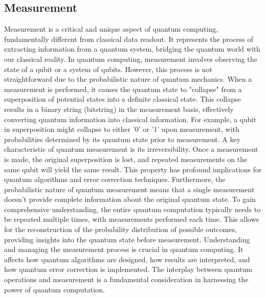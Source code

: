 \documentclass[12pt,oneside,a4paper]{article}
\begin{document}
\subsection{Measurement}
Measurement is a critical and unique aspect of quantum computing, fundamentally different from classical data readout. It represents the process of extracting information from a quantum system, bridging the quantum world with our classical reality.
In quantum computing, measurement involves observing the state of a qubit or a system of qubits. However, this process is not straightforward due to the probabilistic nature of quantum mechanics. When a measurement is performed, it causes the quantum state to "collapse" from a superposition of potential states into a definite classical state.
This collapse results in a binary string (bitstring) in the measurement basis, effectively converting quantum information into classical information. For example, a qubit in superposition might collapse to either '0' or '1' upon measurement, with probabilities determined by its quantum state prior to measurement.
A key characteristic of quantum measurement is its irreversibility. Once a measurement is made, the original superposition is lost, and repeated measurements on the same qubit will yield the same result. This property has profound implications for quantum algorithms and error correction techniques.
Furthermore, the probabilistic nature of quantum measurement means that a single measurement doesn't provide complete information about the original quantum state. To gain comprehensive understanding, the entire quantum computation typically needs to be repeated multiple times, with measurements performed each time. This allows for the reconstruction of the probability distribution of possible outcomes, providing insights into the quantum state before measurement.
Understanding and managing the measurement process is crucial in quantum computing. It affects how quantum algorithms are designed, how results are interpreted, and how quantum error correction is implemented. The interplay between quantum operations and measurement is a fundamental consideration in harnessing the power of quantum computation.
\end{document}
